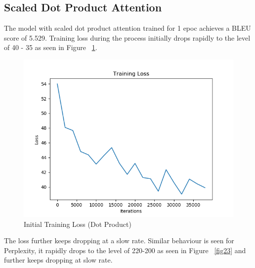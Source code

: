 \documentclass[11pt,a4paper]{article}
\begin{document}

\subsection{Scaled Dot Product Attention}
The model with scaled dot product attention trained for 1 epoc achieves a BLEU score of 5.529.
Training loss during the process initially drops rapidly to the level of 40 - 35 as seen in Figure ~\ref{fig21}.
\begin{figure}[!htbp]
\includegraphics[width=\linewidth]{de_dot_loss_1.png}
\caption{Initial Training Loss (Dot Product)}
\label{fig21}
\end{figure}

The loss further keeps dropping at a slow rate. Similar behaviour is seen for Perplexity, it rapidly drops to the level of 220-200 as seen in Figure ~\ref{fig23} and further keeps dropping at slow rate.


\end{document}
